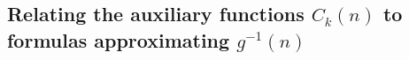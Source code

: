 \documentclass[11pt,reqno,a4letter]{article}
\numberwithin{figure}{section}
\numberwithin{table}{section}
\theoremstyle{plain}
\numberwithin{theorem}{section}
\theoremstyle{definition}
\newtheorem{remark}[theorem]{Remark}
\begin{document}

\subsection{Relating the auxiliary functions $C_k(n)$ to formulas approximating $g^{-1}(n)$} 
\label{subSection_Relating_CknFuncs_to_gInvn} 
\end{document}
